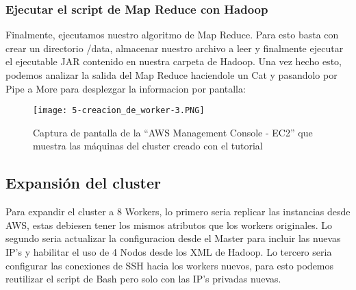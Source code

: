\documentclass[9pt,letterpaper,twoside]{article}
\begin{document}
\newpage

\subsubsection*{Ejecutar el script de Map Reduce con Hadoop}

Finalmente, ejecutamos nuestro algoritmo de Map Reduce. Para esto basta con crear un directorio /data, almacenar nuestro archivo
a leer y finalmente ejecutar el ejecutable JAR contenido en nuestra carpeta de Hadoop. Una vez hecho esto, podemos analizar la
salida del Map Reduce haciendole un Cat y pasandolo por Pipe a More para desplezgar la informacion por pantalla:

\begin{code}[H]
    
\end{code}

\begin{figure}
    \centering
    \texttt{[image: 5-creacion\_de\_worker-3.PNG]}
    \caption{Captura de pantalla de la ``AWS Management Console - EC2'' que muestra las máquinas del cluster creado con el tutorial}
    \label{5-creacion_de_worker-3.PNG}
\end{figure}

\newpage

\subsection{Expansión del cluster}

\noindent
Para expandir el cluster a 8 Workers, lo primero seria replicar las instancias desde AWS, estas debiesen tener los mismos
atributos que los workers originales. Lo segundo seria actualizar la configuracion desde el Master para incluir las nuevas
IP's y habilitar el uso de 4 Nodos desde los XML de Hadoop. Lo tercero seria configurar las conexiones de SSH hacia los workers
nuevos, para esto podemos reutilizar el script de Bash pero solo con las IP's privadas nuevas.

\begin{code}[H]
    
\end{code}

\begin{code}[H]

\end{code}
\end{document}
